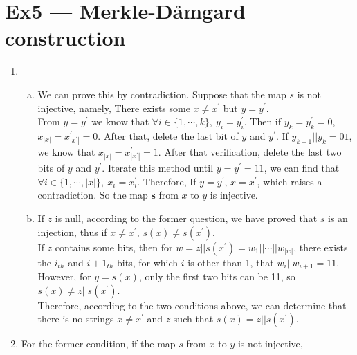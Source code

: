 \documentclass[12pt, a4paper]{article}
\begin{document}
\begin{enumerate}
\begin{enumerate}[(i)]
          \end{enumerate}

\end{enumerate}

\section*{Ex5 --- Merkle-Dåmgard construction}
\begin{enumerate}
    \item \begin{enumerate}[(a)]
          \item We can prove this by contradiction. Suppose that the map $s$ is not injective, namely, 
                There exists some $x \neq x^\prime$ but $y = y^\prime$.\\
                From $y = y^\prime$ we know that $\forall i\in \{1,\cdots,k\},\ y_i = y_i^\prime$. 
                Then if $y_k = y_k^\prime = 0$, $x_{|x|} = x_{|x^\prime|}^\prime = 0$. After that, 
                delete the last bit of $y$ and $y^\prime$. If $y_{k-1}||y_k = 01$, 
                we know that $x_{|x|} = x_{|x^\prime|}^\prime = 1$. After that verification, 
                delete the last two bits of $y$ and $y^\prime$. 
                Iterate this method until $y = y^\prime = 11$, 
                we can find that $\forall i\in\{1,\cdots,|x|\},\ x_i = x_i^\prime$. 
                Therefore, If $y = y^\prime$, $x = x^\prime$, which raises a contradiction. 
                So the map \textbf{s} from $x$ to $y$ is injective.
          \item If $z$ is null, according to the former question, we have proved that $s$ is an injection, 
                thus if $x \neq x^\prime$, $s(x) \neq s(x^\prime)$.\\
                If $z$ contains some bits, then for $w = z||s(x^\prime) = w_1||\cdots||w_{|w|}$, 
                there exists the $i_{th}$ and ${i+1}_{th}$ bits, for which $i$ is other than 1, 
                that $w_i||w_{i+1} = 11$. However, for $y = s(x)$, only the first two bits can be 11, 
                so $s(x) \neq z||s(x^\prime)$.\\
                Therefore, according to the two conditions above, 
                we can determine that there is no strings $x \neq x^\prime$ and $z$ such that $s(x) = z||s(x^\prime)$.
    \end{enumerate}
    \item For the former condition, if the map $s$ from $x$ to $y$ is not injective, 

\end{enumerate}
\end{document}
